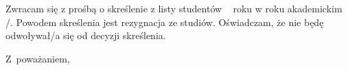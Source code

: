 \documentclass{wmiisubmission}
\begin{document}
\cracowdate
{}
\studentaddress
\addressee{\piotrniemiec}

\vskip 3.0cm


\vskip 0.5cm

Zwracam się z prośbą o skreślenie z listy studentów \fillField{2cm}~ roku w roku
akademickim \fillField{1cm}/\fillField{1cm}. Powodem skreślenia jest rezygnacja
ze studiów.
Oświadczam, że nie będę odwoływał/a się od decyzji skreślenia.

\vskip 2.0cm

\hspace{\fill} Z~poważaniem, \hspace{2.0cm}

\vfill

\end{document}
